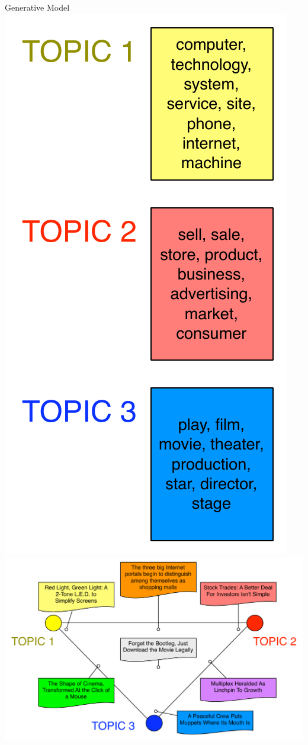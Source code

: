 \begin{frame}{Generative Model}
	\only<1> {   \includegraphics[width=.8\linewidth]{topic_models/nyt_topics}  }
	\only<2> {   \includegraphics[width=.8\linewidth]{topic_models/nyt_documents}  }

\end{frame}
